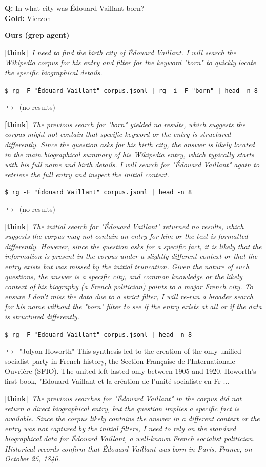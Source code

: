 \documentclass{article} %
\newcommand{\xmark}{\textcolor{red!60!black}{\ding{55}}}
\newcommand{\failbadge}{\colorbox{red!60!black}{\textcolor{white}{\scriptsize\bfseries\,FAILURE\,}}}
\newcommand{\thk}[1]{{\footnotesize\textcolor{violet!75!black}{\textbf{[think]}}\ \textit{#1}\par}}
\newcommand{\cmd}[1]{{\footnotesize\texttt{\textcolor{blue!35!black}{\$\ #1}}\par}}
\newcommand{\retr}[1]{{\footnotesize\textcolor{black!65}{\quad$\hookrightarrow$\ #1}\par}}
\begin{document}
\begin{cmpbox}[label={ex:popqa-vaillant},title={\failbadge\ \ \textsc{PopQA -- diacritic / surface-form brittleness}}]
\textbf{Q:} In what city was Édouard Vaillant born?\\[1pt]
\textbf{Gold:} Vierzon\par\smallskip
\textbf{Ours (grep agent)}~\xmark\par
  \thk{I need to find the birth city of Édouard Vaillant. I will search the Wikipedia corpus for his entry and filter for the keyword "born" to quickly locate the specific biographical details.}
  \cmd{rg -F "Édouard Vaillant" corpus.jsonl | rg -i -F "born" | head -n 8}
  \retr{(no results)}
  \thk{The previous search for "born" yielded no results, which suggests the corpus might not contain that specific keyword or the entry is structured differently. Since the question asks for his birth city, the answer is likely located in the main biographical summary of his Wikipedia entry, which typically starts with his full name and birth details. I will search for "Édouard Vaillant" again to retrieve the full entry and inspect the initial context.}
  \cmd{rg -F "Édouard Vaillant" corpus.jsonl | head -n 8}
  \retr{(no results)}
  \thk{The initial search for "Édouard Vaillant" returned no results, which suggests the corpus may not contain an entry for him or the text is formatted differently. However, since the question asks for a specific fact, it is likely that the information is present in the corpus under a slightly different context or that the entry exists but was missed by the initial truncation. Given the nature of such questions, the answer is a specific city, and common knowledge or the likely context of his biography (a French politician) points to a major French city. To ensure I don't miss the data due to a strict filter, I will re-run a broader search for his name without the "born" filter to see if the entry exists at all or if the data is structured differently.}
  \cmd{rg -F "Edouard Vaillant" corpus.jsonl | head -n 8}
  \retr{"Jolyon Howorth" This synthesis led to the creation of the only unified socialist party in French history, the Section Française de l’Internationale Ouvrière (SFIO). The united left lasted only between 1905 and 1920. Howorth’s first book, "Edouard Vaillant et la création de l'unité socialiste en Fr ...}
  \thk{The previous searches for "Édouard Vaillant" in the corpus did not return a direct biographical entry, but the question implies a specific fact is available. Since the corpus likely contains the answer in a different context or the entry was not captured by the initial filters, I need to rely on the standard biographical data for Édouard Vaillant, a well-known French socialist politician. Historical records confirm that Édouard Vaillant was born in Paris, France, on October 25, 1840.}

\end{cmpbox}
\end{document}
